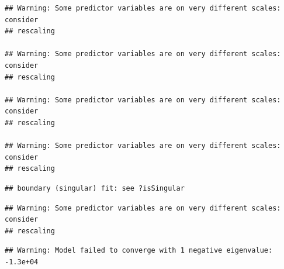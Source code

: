 \documentclass[
  12pt,
]{article}
\begin{document}
\begin{verbatim}
## Warning: Some predictor variables are on very different scales: consider
## rescaling

## Warning: Some predictor variables are on very different scales: consider
## rescaling

## Warning: Some predictor variables are on very different scales: consider
## rescaling

## Warning: Some predictor variables are on very different scales: consider
## rescaling
\end{verbatim}

\begin{verbatim}
## boundary (singular) fit: see ?isSingular
\end{verbatim}

\begin{verbatim}
## Warning: Some predictor variables are on very different scales: consider
## rescaling
\end{verbatim}

\begin{verbatim}
## Warning: Model failed to converge with 1 negative eigenvalue: -1.3e+04
\end{verbatim}
\end{document}
